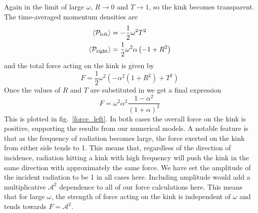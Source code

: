 \documentclass[11pt, oneside]{article}  	%
\numberwithin{equation}{section}
\begin{document}
Again in the limit of large $\omega$, $R \rightarrow 0$ and $T \rightarrow 1$, so the kink becomes transparent. The time-averaged momentum densities are
\begin{align}
 \left \langle \mathcal{P}_\textup{left} \right \rangle &= -\frac{1}{2}\omega^2 T^2 \\
 \left \langle \mathcal{P}_\textup{right} \right \rangle &= \frac{1}{2}\omega^2\alpha \left( -1 + R^2 \right) 
\end{align}
and the total force acting on the kink is given by
\begin{equation}
F = \frac{1}{2} \omega^2 \left ( -\alpha^2(1 +R^2) + T^2 \right ) 
\end{equation}
Once the values of $R$ and $T$ are substituted in we get a final expression
\begin{equation}
F = \omega^2 \alpha^2 \frac{1-\alpha^2}{(1+\alpha)^2} 
\end{equation}
This is plotted in fig.~\ref{force_left}. In both cases the overall force on the kink is positive, supporting the results from our numerical models. A notable feature is that as the frequency of radiation becomes large, the force exerted on the kink from either side tends to 1. This means that, regardless of the direction of incidence, radiation hitting a kink with high frequency will push the kink in the same direction with approximately the same force. We have set the amplitude of the incident radiation to be 1 in all cases here. Including amplitude would add a multiplicative $\mathcal{A}^2$ dependence to all of our force calculations here. This means that for large $\omega$, the strength of force acting on the kink is independent of $\omega$ and tends towards $F = \mathcal{A}^2$. 
\end{document}

